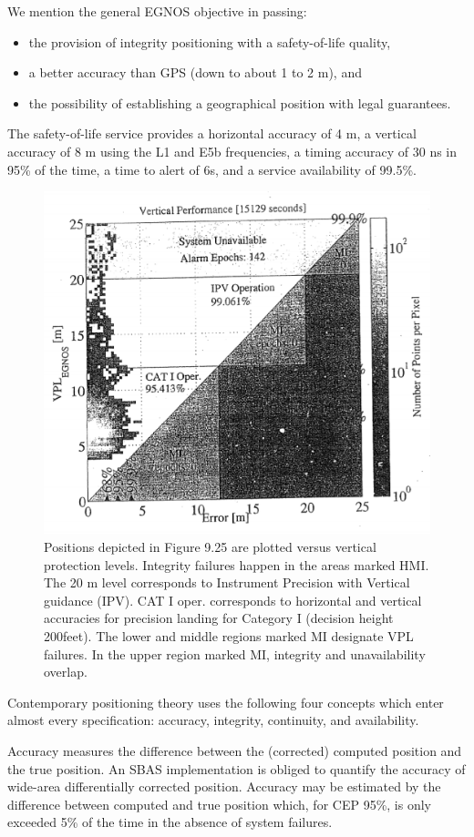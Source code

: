 		We mention the general EGNOS objective in passing:
		\begin{itemize}
			\item the provision of integrity positioning with a safety-of-life quality,
			\item a better accuracy than GPS (down to about 1 to 2 m), and
			\item the possibility of establishing a geographical position with legal guarantees.
		\end{itemize}
		
		The safety-of-life service provides a horizontal accuracy of 4 m, a vertical accuracy of 8 m using the L1 and E5b frequencies, a timing accuracy of 30 ns in 95\% of the time, a time to alert of 6s, and a service availability of 99.5\%.
		\begin{figure}[h]
			\centering
			\includegraphics[width=0.7\linewidth]{TeX_files/Part03/chapter09/image/9-28}
			\caption{Positions depicted in Figure 9.25 are plotted versus vertical protection levels. Integrity failures happen in the areas marked HMI. The 20 m level corresponds to Instrument Precision with Vertical guidance (IPV). CAT I oper. corresponds to horizontal and vertical accuracies for precision landing for Category I (decision height 200feet). The lower and middle regions marked MI designate VPL failures. In the upper region marked MI, integrity and unavailability overlap.}
			\label{fig:9-28}
		\end{figure}
		Contemporary positioning theory uses the following four concepts which enter almost every specification: accuracy, integrity, continuity, and availability.
		
		Accuracy measures the difference between the (corrected) computed position and the true position. An SBAS implementation is obliged to quantify the accuracy of wide-area differentially corrected position. Accuracy may be estimated by the difference between computed and true position which, for CEP 95\%, is only exceeded 5\% of the time in the absence of system failures.
		
